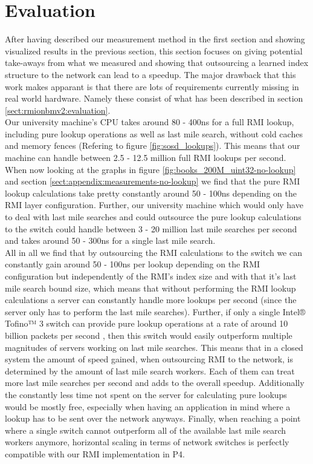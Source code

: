 \section{Evaluation}
After having described our measurement method in the first section and showing visualized results in the previous section, this section focuses on giving potential take-aways from what we measured and showing that outsourcing a learned index structure to the network can lead to a speedup. The major drawback that this work makes apparant is that there are lots of requirements currently missing in real world hardware. Namely these consist of what has been described in section \ref{sect:rmionbmv2:evaluation}.\\

Our university machine's CPU takes around 80 - 400ns for a full RMI lookup, including pure lookup operations as well as last mile search, without cold caches and memory fences (Refering to figure \ref{fig:sosd_lookups}). This means that our machine can handle between 2.5 - 12.5 million full RMI lookups per second. When now looking at the graphs in figure \ref{fig:books_200M_uint32-no-lookup} and section \ref{sect:appendix:measurements-no-lookup} we find that the pure RMI lookup calculations take pretty constantly around 50 - 100ns depending on the RMI layer configuration. Further, our university machine which would only have to deal with last mile searches and could outsource the pure lookup calculations to the switch could handle between 3 - 20 million last mile searches per second and takes around 50 - 300ns for a single last mile search.\\

All in all we find that by outsourcing the RMI calculations to the switch we can constantly gain around 50 - 100ns per lookup depending on the RMI configuration but independently of the RMI's index size and with that it's last mile search bound size, which means that without performing the RMI lookup calculations a server can constantly handle more lookups per second (since the server only has to perform the last mile searches). Further, if only a single Intel® Tofino™ 3 switch can provide pure lookup operations at a rate of around 10 billion packets per second \cite{tofino3-brief}, then this switch would easily outperform multiple magnitudes of servers working on last mile searches. This means that in a closed system the amount of speed gained, when outsourcing RMI to the network, is determined by the amount of last mile search workers. Each of them can treat more last mile searches per second and adds to the overall speedup. Additionally the constantly less time not spent on the server for calculating pure lookups would be mostly free, especially when having an application in mind where a lookup has to be sent over the network anyways. Finally, when reaching a point where a single switch cannot outperform all of the available last mile search workers anymore, horizontal scaling in terms of network switches is perfectly compatible with our RMI implementation in P4.\\

